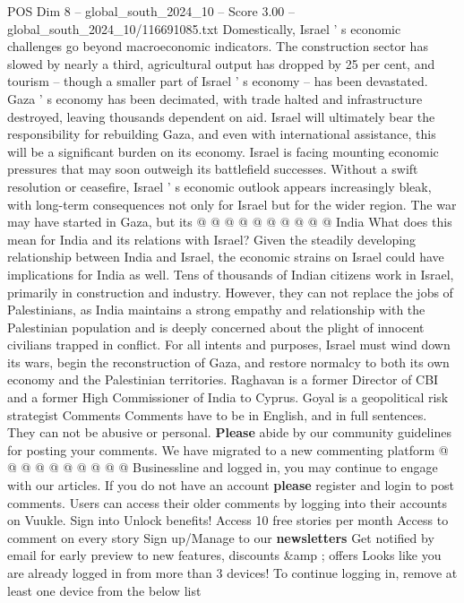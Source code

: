 \begin{textsample}{POS Dim 8 – global\_south\_2024\_10 – Score 3.00 – global\_south\_2024\_10/116691085.txt}
Domestically, Israel ' s economic challenges go beyond macroeconomic indicators.
The construction sector has slowed by nearly a third, agricultural output has dropped by 25 per cent, and tourism -- though a smaller part of Israel ' s economy -- has been devastated.
Gaza ' s economy has been decimated, with trade halted and infrastructure destroyed, leaving thousands dependent on aid.
Israel will ultimately bear the responsibility for rebuilding Gaza, and even with international assistance, this will be a significant burden on its economy.
Israel is facing mounting economic pressures that may soon outweigh its battlefield successes.
Without a swift resolution or ceasefire, Israel ' s economic outlook appears increasingly bleak, with long-term consequences not only for Israel but for the wider region.
The war may have started in Gaza, but its @ @ @ @ @ @ @ @ @ @ India What does this mean for India and its relations with Israel?
Given the steadily developing relationship between India and Israel, the economic strains on Israel could have implications for India as well.
Tens of thousands of Indian citizens work in Israel, primarily in construction and industry.
However, they can not replace the jobs of Palestinians, as India maintains a strong empathy and relationship with the Palestinian population and is deeply concerned about the plight of innocent civilians trapped in conflict.
For all intents and purposes, Israel must wind down its wars, begin the reconstruction of Gaza, and restore normalcy to both its own economy and the Palestinian territories.
Raghavan is a former Director of CBI and a former High Commissioner of India to Cyprus.
Goyal is a geopolitical risk strategist Comments Comments have to be in English, and in full sentences.
They can not be abusive or personal. \textbf{Please} abide by our community guidelines for posting your comments.
We have migrated to a new commenting platform @ @ @ @ @ @ @ @ @ @ Businessline and logged in, you may continue to engage with our articles.
If you do not have an account \textbf{please} register and login to post comments.
Users can access their older comments by logging into their accounts on Vuukle.
Sign into Unlock benefits!
Access 10 free stories per month Access to comment on every story Sign up/Manage to our \textbf{newsletters} Get notified by email for early preview to new features, discounts \&amp ; offers Looks like you are already logged in from more than 3 devices!
To continue logging in, remove at least one device from the below list

\end{textsample}
